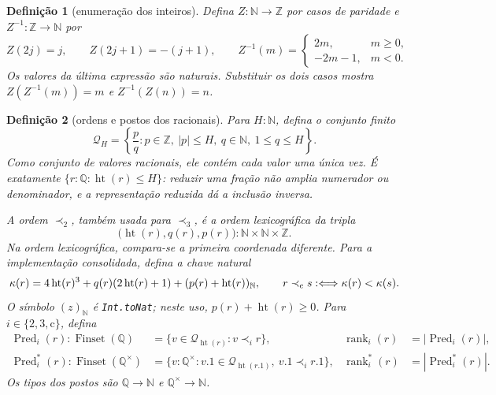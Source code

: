 \documentclass[11pt,a4paper]{article}
\newtheorem{definicao}{Definição}[section]
\newcommand{\N}{\mathbb N}
\newcommand{\Z}{\mathbb Z}
\newcommand{\Q}{\mathbb Q}
\newcommand{\FS}{\operatorname{Finset}}
\newcommand{\htq}{\operatorname{ht}}
\newcommand{\pred}{\operatorname{Pred}}
\newcommand{\rankq}{\operatorname{rank}}
\newcommand{\qstar}{\Q^{\times}}
\newcommand{\code}[1]{\nolinkurl{#1}}
\begin{document}
\begin{definicao}[enumeração dos inteiros]
Defina $Z:\N\to\Z$ por casos de paridade e $Z^{-1}:\Z\to\N$ por
\[
 Z(2j)=j,\qquad Z(2j+1)=-(j+1),\qquad
 Z^{-1}(m)=\begin{cases}2m,&m\ge0,\\-2m-1,&m<0.\end{cases}
\]
Os valores da última expressão são naturais. Substituir os dois casos
mostra $Z(Z^{-1}(m))=m$ e $Z^{-1}(Z(n))=n$.
\end{definicao}

\begin{definicao}[ordens e postos dos racionais]\label{def:rank}
Para $H:\N$, defina o conjunto finito
\[
 \mathcal Q_H=
 \left\{\frac{p}{q}:p\in\Z,\ |p|\le H,
                         \ q\in\N,\ 1\le q\le H\right\}.
\]
Como conjunto de valores racionais, ele contém cada valor uma única
vez. É exatamente $\{r:\Q:\htq(r)\le H\}$: reduzir uma fração não
amplia numerador ou denominador, e a representação reduzida dá a
inclusão inversa.

A ordem $\prec_2$, também usada para $\prec_3$, é a ordem
lexicográfica da tripla
\[
 \bigl(\htq(r),q(r),p(r)\bigr):\N\times\N\times\Z.
\]
Na ordem lexicográfica, compara-se a primeira coordenada diferente.
Para a implementação consolidada, defina a chave natural
\[
 \kappa(r)=4\htq(r)^3+q(r)(2\htq(r)+1)
                  +(p(r)+\htq(r))_{\N},
 \qquad r\prec_{\rm c}s:\Longleftrightarrow\kappa(r)<\kappa(s).
\]
O símbolo $(z)_{\N}$ é \code{Int.toNat}; neste uso,
$p(r)+\htq(r)\ge0$.
Para $i\in\{2,3,\mathrm c\}$, defina
\begin{align*}
 \pred_i(r):\FS(\Q)&=\{v\in\mathcal Q_{\htq(r)}:v\prec_i r\},
 &\rankq_i(r)&=|\pred_i(r)|,\\
 \pred_i^*(r):\FS(\qstar)&=\{v:\qstar:v.1\in\mathcal Q_{\htq(r.1)},\ v.1\prec_i r.1\},
 &\rankq_i^*(r)&=|\pred_i^*(r)|.
\end{align*}
Os tipos dos postos são $\Q\to\N$ e $\qstar\to\N$.
\end{definicao}
\end{document}
